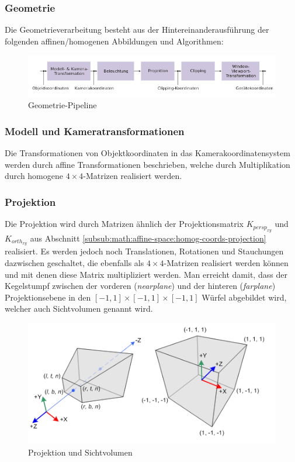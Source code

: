 \subsubsection{Geometrie}
Die Geometrieverarbeitung   besteht aus der Hintereinanderausführung der folgenden affinen/homogenen Abbildungen und Algorithmen:
\begin{figure}[H]
    \centering
    \includegraphics[width=1.0\textwidth]{images/cgpipeline.png}
    \caption{Geometrie-Pipeline}
    \label{fig:cgpipeline-geometry}
\end{figure}

\subsubsection*{Modell und Kameratransformationen}
Die Transformationen von Objektkoordinaten in das Kamerakoordinatensystem werden durch affine Transformationen beschrieben, welche durch Multiplikation durch homogene $4 \times 4$-Matrizen realisiert werden. 

\subsubsection*{Projektion}
Die Projektion wird durch Matrizen ähnlich der Projektionsmatrix 
$K_{persp_{xy}}$ und $K_{orth_{xy}}$ aus Abschnitt 
\ref{subsub:math:affine-space:homog-coords-projection} realisiert. 
Es werden jedoch noch  Translationen, Rotationen und Stauchungen 
dazwischen geschaltet, die ebenfalls als $4 \times 4$-Matrizen realisiert werden 
können und mit denen diese Matrix multipliziert werden. 
Man erreicht damit, dass der Kegelstumpf zwischen der vorderen 
(\textit{nearplane}) und der hinteren (\textit{farplane}) Projektionsebene in 
den $[-1,1] \times [-1,1] \times [-1,1] $ Würfel abgebildet wird, welcher auch 
Sichtvolumen genannt wird. 
\begin{figure}[H]
    \centering
    \includegraphics[width=1.0\textwidth]{images/gl_projectionmatrix01.png}
    \caption{Projektion und Sichtvolumen}
    \label{fig:projection-sight-vol}
\end{figure}

